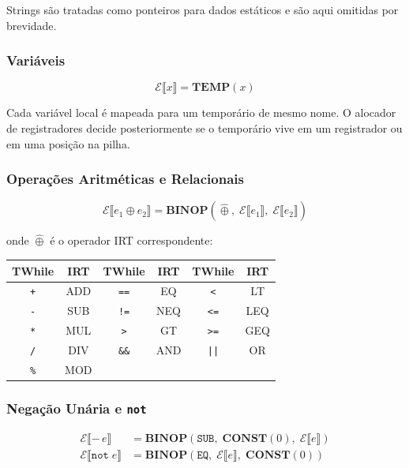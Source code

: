Strings são tratadas como ponteiros para dados estáticos e são aqui omitidas
por brevidade.

\subsubsection*{Variáveis}

\[
  \mathcal{E}\llbracket x \rrbracket = \mathbf{TEMP}(x)
\]

Cada variável local é mapeada para um temporário de mesmo nome.  O alocador
de registradores decide posteriormente se o temporário vive em um registrador
ou em uma posição na pilha.

\subsubsection*{Operações Aritméticas e Relacionais}

\[
  \mathcal{E}\llbracket e_1 \oplus e_2 \rrbracket =
  \mathbf{BINOP}(\widehat{\oplus},\;
    \mathcal{E}\llbracket e_1 \rrbracket,\;
  \mathcal{E}\llbracket e_2 \rrbracket)
\]

onde $\widehat{\oplus}$ é o operador IRT correspondente:

\begin{center}
  \renewcommand{\arraystretch}{1.2}
  \begin{tabular}{cc|cc|cc}
    \toprule
    TWhile & IRT & TWhile & IRT & TWhile & IRT \\
    \midrule
    \texttt{+}  & ADD & \texttt{==} & EQ  & \texttt{<}  & LT  \\
    \texttt{-}  & SUB & \texttt{!=} & NEQ & \texttt{<=} & LEQ \\
    \texttt{*}  & MUL & \texttt{>}  & GT  & \texttt{>=} & GEQ \\
    \texttt{/}  & DIV & \texttt{\&\&} & AND & \texttt{||} & OR \\
    \texttt{\%} & MOD & & & & \\
    \bottomrule
  \end{tabular}
\end{center}

\subsubsection*{Negação Unária e \texttt{not}}

\begin{align*}
  \mathcal{E}\llbracket -\, e \rrbracket
  &= \mathbf{BINOP}(\mathtt{SUB},\; \mathbf{CONST}(0),\;
  \mathcal{E}\llbracket e \rrbracket) \\
  \mathcal{E}\llbracket \mathtt{not}\; e \rrbracket
  &= \mathbf{BINOP}(\mathtt{EQ},\;
  \mathcal{E}\llbracket e \rrbracket,\; \mathbf{CONST}(0))
\end{align*}

